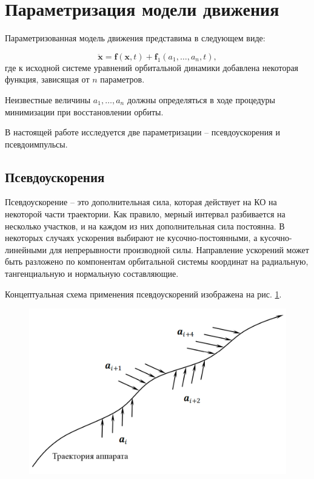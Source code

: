 \section{Параметризация модели движения}
\label{sec:Chapter2} 

Параметризованная модель движения представима в следующем виде:

\begin{equation*}
    \ddot{\mathbf{x}} = \mathbf{f}(\mathbf{x}, t) +
    \mathbf{f}_1(a_1, \dots, a_n, t),
\end{equation*}
где к исходной системе уравнений орбитальной динамики добавлена
некоторая функция, зависящая от $n$ параметров.

Неизвестные величины $a_1, \dots, a_n$ должны определяться в ходе процедуры минимизации при
восстановлении орбиты.

В настоящей работе исследуется две параметризации -- псевдоускорения и псевдоимпульсы.

\subsection{Псевдоускорения}

Псевдоускорение -- это дополнительная сила, которая действует на КО на некоторой части 
траектории. Как правило, мерный интервал разбивается на несколько участков, и на каждом
из них дополнительная сила постоянна. В некоторых случаях ускорения выбирают не
кусочно-постоянными, а кусочно-линейными для непрерывности производной силы.
Направление ускорений может быть разложено по компонентам орбитальной системы координат на радиальную, тангенциальную и нормальную
составляющие. 

Концептуальная схема применения псевдоускорений изображена на рис. \ref{fig:pseudoacc}.

\begin{figure}[h!]
    \centering
    \includegraphics[width=0.8\linewidth]{../images/solution/lageos/pseudoacc.png}
    \label{fig:pseudoacc}
 \end{figure}

